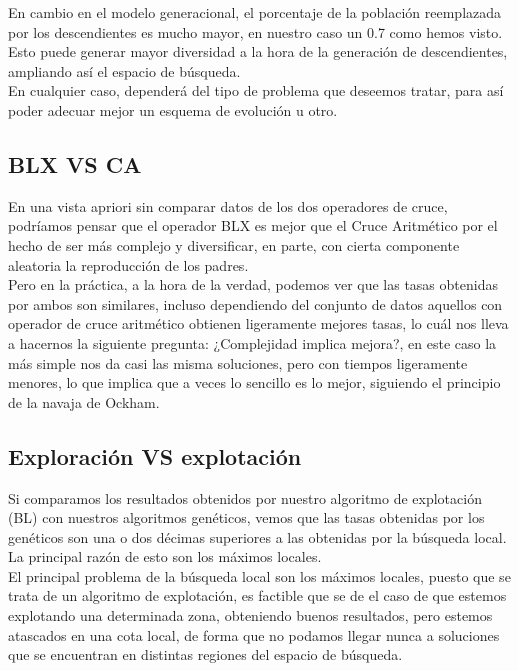 En cambio en el modelo generacional, el porcentaje de la población reemplazada por los descendientes es mucho mayor, en nuestro caso un 0.7 como hemos visto. Esto puede generar mayor diversidad a la hora de la generación de descendientes, ampliando así el espacio de búsqueda. \\ 
En cualquier caso, dependerá del tipo de problema que deseemos tratar, para así poder adecuar mejor un esquema de evolución u otro.

\subsection{BLX VS CA}
En una vista apriori sin comparar datos de los dos operadores de cruce, podríamos pensar que el operador BLX es mejor que el Cruce Aritmético por el hecho de ser más complejo y diversificar, en parte, con cierta componente aleatoria la reproducción de los padres.\\ 

Pero en la práctica, a la hora de la verdad, podemos ver que las tasas obtenidas por ambos son similares, incluso dependiendo del conjunto de datos aquellos con operador de cruce aritmético obtienen ligeramente mejores tasas, lo cuál nos lleva a hacernos la siguiente pregunta: ¿Complejidad implica mejora?, en este caso la más simple nos da casi las misma soluciones, pero con tiempos ligeramente menores, lo que implica que a veces lo sencillo es lo mejor, siguiendo el principio de la navaja de Ockham.

\subsection{Exploración VS explotación}

Si comparamos los resultados obtenidos por nuestro algoritmo de explotación (BL) con nuestros algoritmos genéticos, vemos que las tasas obtenidas por los genéticos son una o dos décimas superiores a las obtenidas por la búsqueda local. La principal razón de esto son los máximos locales.\\ 
El principal problema de la búsqueda local son los máximos locales, puesto que se trata de un algoritmo de explotación, es factible que se de el caso de que estemos explotando una determinada zona, obteniendo buenos resultados, pero estemos atascados en una cota local, de forma que no podamos llegar nunca a soluciones que se encuentran en distintas regiones del espacio de búsqueda.\\ 

